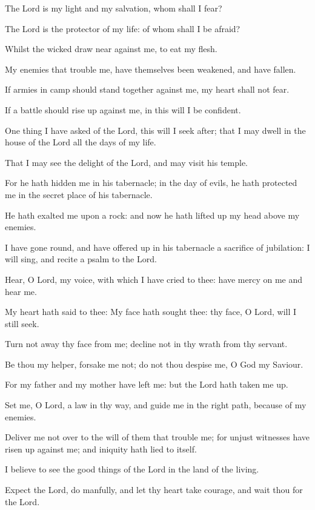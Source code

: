 ﻿\item The Lord is my light and my salvation, whom shall I fear?
\item The Lord is the protector of my life: of whom shall I be afraid?
\item Whilst the wicked draw near against me, to eat my flesh.
\item My enemies that trouble me, have themselves been weakened, and have fallen.
\item If armies in camp should stand together against me, my heart shall not fear.
\item If a battle should rise up against me, in this will I be confident.
\item One thing I have asked of the Lord, this will I seek after; that I may dwell in the house of the Lord all the days of my life.
\item That I may see the delight of the Lord, and may visit his temple.
\item For he hath hidden me in his tabernacle; in the day of evils, he hath protected me in the secret place of his tabernacle.
\item He hath exalted me upon a rock: and now he hath lifted up my head above my enemies.
\item I have gone round, and have offered up in his tabernacle a sacrifice of jubilation: I will sing, and recite a psalm to the Lord.
\item Hear, O Lord, my voice, with which I have cried to thee: have mercy on me and hear me.
\item My heart hath said to thee: My face hath sought thee: thy face, O Lord, will I still seek.
\item Turn not away thy face from me; decline not in thy wrath from thy servant.
\item Be thou my helper, forsake me not; do not thou despise me, O God my Saviour.
\item For my father and my mother have left me: but the Lord hath taken me up.
\item Set me, O Lord, a law in thy way, and guide me in the right path, because of my enemies.
\item Deliver me not over to the will of them that trouble me; for unjust witnesses have risen up against me; and iniquity hath lied to itself.
\item I believe to see the good things of the Lord in the land of the living.
\item Expect the Lord, do manfully, and let thy heart take courage, and wait thou for the Lord.
